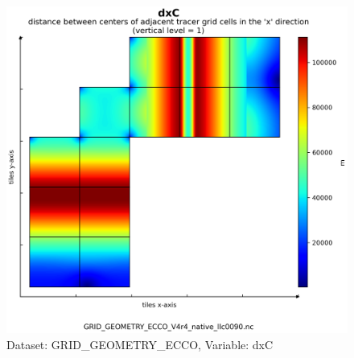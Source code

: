 \begin{figure}[H]
\centering
\includegraphics[scale=0.55]{../images/plots/v4r4/native_plots_coords/Geometry_Parameters_for_the_Lat-Lon-Cap_90_(llc90)_Native_Model_Grid_(Version_4_Release_4)/dxC.png}
\caption{Dataset: GRID\_GEOMETRY\_ECCO, Variable: dxC}
\label{tab:table-GRID_GEOMETRY_ECCO_dxC-Plot}
\end{figure}
\newpage
\pagebreak
